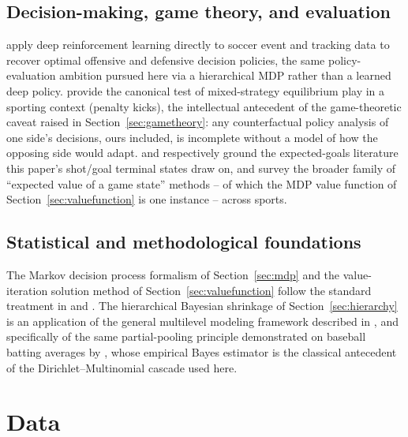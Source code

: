 \documentclass[11pt]{article}
\theoremstyle{plain}
\theoremstyle{definition}
\theoremstyle{remark}
\begin{document}
\subsection{Decision-making, game theory, and evaluation}
\citet{rahimian2024datadriven} apply deep reinforcement learning directly to soccer event and tracking data to recover optimal offensive and defensive decision policies, the same policy-evaluation ambition pursued here via a hierarchical MDP rather than a learned deep policy. \citet{chiappori2002testing} provide the canonical test of mixed-strategy equilibrium play in a sporting context (penalty kicks), the intellectual antecedent of the game-theoretic caveat raised in Section~\ref{sec:gametheory}: any counterfactual policy analysis of one side's decisions, ours included, is incomplete without a model of how the opposing side would adapt. \citet{mead2023expected} and \citet{baumer2023bigideas} respectively ground the expected-goals literature this paper's shot/goal terminal states draw on, and survey the broader family of ``expected value of a game state'' methods -- of which the MDP value function of Section~\ref{sec:valuefunction} is one instance -- across sports.

\subsection{Statistical and methodological foundations}
The Markov decision process formalism of Section~\ref{sec:mdp} and the value-iteration solution method of Section~\ref{sec:valuefunction} follow the standard treatment in \citet{puterman1994markov} and \citet{suttonbarto2018reinforcement}. The hierarchical Bayesian shrinkage of Section~\ref{sec:hierarchy} is an application of the general multilevel modeling framework described in \citet{gelmanhill2007data}, and specifically of the same partial-pooling principle demonstrated on baseball batting averages by \citet{efronmorris1975data}, whose empirical Bayes estimator is the classical antecedent of the Dirichlet--Multinomial cascade used here.

\section{Data}
\label{sec:data}
\end{document}
